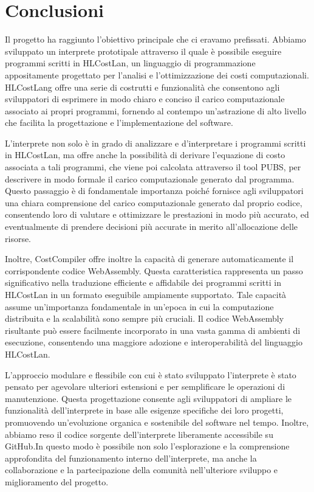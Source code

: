 \documentclass[../../main.tex]{subfiles}
\begin{document}
\chapter{Conclusioni}
Il progetto ha raggiunto l'obiettivo principale che ci eravamo prefissati. Abbiamo sviluppato un interprete prototipale attraverso il quale è possibile eseguire programmi scritti in HLCostLan, un linguaggio di programmazione appositamente progettato per l'analisi e l'ottimizzazione dei costi computazionali. HLCostLang offre una serie di costrutti e funzionalità che consentono agli sviluppatori di esprimere in modo chiaro e conciso il carico computazionale associato ai propri programmi, fornendo al contempo un'astrazione di alto livello che facilita la progettazione e l'implementazione del software.

L'interprete non solo è in grado di analizzare e d'interpretare i programmi scritti in HLCostLan, ma offre anche la possibilità di derivare l'equazione di costo associata a tali programmi, che viene poi calcolata attraverso il tool PUBS, per descrivere in modo formale il carico computazionale generato dal programma. Questo passaggio è di fondamentale importanza poiché fornisce agli sviluppatori una chiara comprensione del carico computazionale generato dal proprio codice, consentendo loro di valutare e ottimizzare le prestazioni in modo più accurato, ed eventualmente di prendere decisioni più accurate in merito all'allocazione delle risorse.

Inoltre, CostCompiler offre inoltre la capacità di generare automaticamente il corrispondente codice WebAssembly. Questa caratteristica rappresenta un passo significativo nella traduzione efficiente e affidabile dei programmi scritti in HLCostLan in un formato eseguibile ampiamente supportato. Tale capacità assume un'importanza fondamentale in un'epoca in cui la computazione distribuita e la scalabilità sono sempre più cruciali. Il codice WebAssembly risultante può essere facilmente incorporato in una vasta gamma di ambienti di esecuzione, consentendo una maggiore adozione e interoperabilità del linguaggio HLCostLan.

L'approccio modulare e flessibile con cui è stato sviluppato l'interprete è stato pensato per agevolare ulteriori estensioni e per semplificare le operazioni di manutenzione. Questa progettazione consente agli sviluppatori di ampliare le funzionalità dell'interprete in base alle esigenze specifiche dei loro progetti, promuovendo un'evoluzione organica e sostenibile del software nel tempo. Inoltre, abbiamo reso il codice sorgente dell'interprete liberamente accessibile su GitHub.In questo modo è possibile non solo l'esplorazione e la comprensione approfondita del funzionamento interno dell'interprete, ma anche la collaborazione e la partecipazione della comunità nell'ulteriore sviluppo e miglioramento del progetto.
\end{document}
